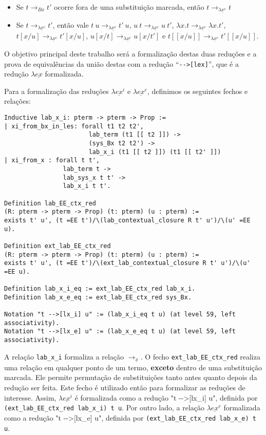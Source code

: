 \begin{itemize}
    \item Se $t \rightarrow_{Bx} t'$ ocorre fora de uma substituição marcada, então 
        $t \rightarrow_{\lambda \underline{x}^e} t$ 
    \item Se $t \rightarrow_{\lambda \underline{x}^e} t'$, então vale 
        $t\ u \rightarrow_{\lambda \underline{x}^e} t'\ u$,  
        $u\ t \rightarrow_{\lambda \underline{x}^e} u\ t'$, 
        $\lambda x. t \rightarrow_{\lambda \underline{x}^e} \lambda x. t'$, 
        $t[x/u] \rightarrow_{\lambda \underline{x}^e} t'[x/u]$, 
        $u[x/t] \rightarrow_{\lambda \underline{x}^e} u[x/t']$ e 
        $t[\![x/u]\!] \rightarrow_{\lambda \underline{x}^e} t'[\![x/u]\!]$.
\end{itemize}

O objetivo principal deste trabalho será a formalização destas duas reduções e a
prova de equivalências da união destas com a redução ``\texttt{-{}->[lex]}'', que é a
redução $\lambda \underline{ex}$ formalizada.

Para a formalização das reduções $\lambda \underline{ex}^i$ e $\lambda
\underline{ex}^e$, definimos os seguintes fechos e relações:

\begin{lstlisting}[basicstyle=\small]
Inductive lab_x_i: pterm -> pterm -> Prop :=
| xi_from_bx_in_les: forall t1 t2 t2', 
                       lab_term (t1 [[ t2 ]]) ->
                       (sys_Bx t2 t2') ->
                       lab_x_i (t1 [[ t2 ]]) (t1 [[ t2' ]])
| xi_from_x : forall t t', 
                lab_term t ->
                lab_sys_x t t' -> 
                lab_x_i t t'. 

Definition lab_EE_ctx_red 
(R: pterm -> pterm -> Prop) (t: pterm) (u : pterm) := 
exists t' u', (t =EE t')/\(lab_contextual_closure R t' u')/\(u' =EE u).

Definition ext_lab_EE_ctx_red 
(R: pterm -> pterm -> Prop) (t: pterm) (u : pterm) := 
exists t' u', (t =EE t')/\(ext_lab_contextual_closure R t' u')/\(u' =EE u).

Definition lab_x_i_eq := ext_lab_EE_ctx_red lab_x_i.
Definition lab_x_e_eq := ext_lab_EE_ctx_red sys_Bx.

Notation "t -->[lx_i] u" := (lab_x_i_eq t u) (at level 59, left associativity).
Notation "t -->[lx_e] u" := (lab_x_e_eq t u) (at level 59, left associativity).
\end{lstlisting}

A relação \texttt{lab\_x\_i} formaliza a relação $\rightarrow_{\underline{x}}$.
O fecho \texttt{ext\_lab\_EE\_ctx\_red} realiza uma relação em qualquer ponto de
um termo, \textbf{exceto} dentro de uma substituição marcada. Ele permite
permutação de substituições tanto antes quanto depois da redução ser feita. Este
fecho é utilizado então para formalizar as reduções de interesse. Assim,
$\lambda \underline{ex}^i$ é formalizada como a redução "t -{}->[lx\_i] u",
definida por \texttt{(ext\_lab\_EE\_ctx\_red lab\_x\_i) t u}. Por outro lado, a
relação $\lambda \underline{ex}^e$ formalizada como a redução "t -{}->[lx\_e] u",
definida por \texttt{(ext\_lab\_EE\_ctx\_red lab\_x\_e) t u}. 

